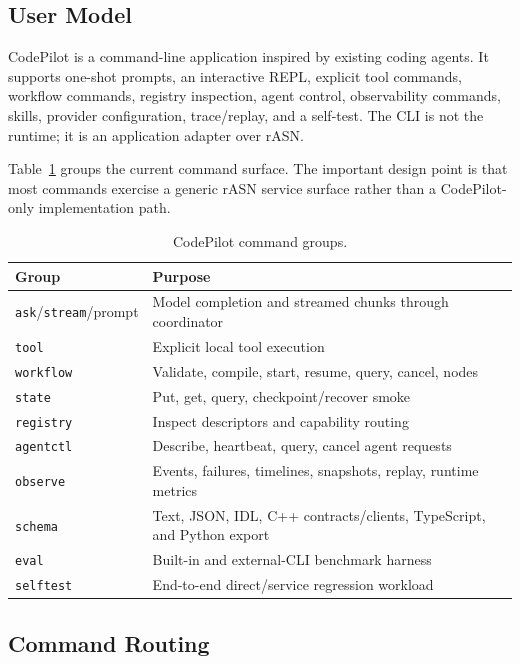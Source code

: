 \documentclass[manuscript,screen,review]{acmart}
\newcommand{\rasn}{rASN\xspace}
\newcommand{\codepilot}{CodePilot\xspace}
\begin{document}
\subsection{User Model}

\codepilot is a command-line application inspired by existing coding agents.
It supports one-shot prompts, an interactive REPL, explicit tool commands,
workflow commands, registry inspection, agent control, observability commands,
skills, provider configuration, trace/replay, and a self-test. The CLI is not
the runtime; it is an application adapter over \rasn.

Table~\ref{tab:codepilot-commands} groups the current command surface. The
important design point is that most commands exercise a generic \rasn service
surface rather than a CodePilot-only implementation path.

\begin{table}[t]
\caption{\codepilot command groups.}
\label{tab:codepilot-commands}
\centering
\begin{tabular}{ll}
\toprule
Group & Purpose \\
\midrule
\texttt{ask}/\texttt{stream}/prompt & Model completion and streamed chunks through coordinator \\
\texttt{tool} & Explicit local tool execution \\
\texttt{workflow} & Validate, compile, start, resume, query, cancel, nodes \\
\texttt{state} & Put, get, query, checkpoint/recover smoke \\
\texttt{registry} & Inspect descriptors and capability routing \\
\texttt{agentctl} & Describe, heartbeat, query, cancel agent requests \\
\texttt{observe} & Events, failures, timelines, snapshots, replay, runtime metrics \\
\texttt{schema} & Text, JSON, IDL, C++ contracts/clients, TypeScript, and Python export \\
\texttt{eval} & Built-in and external-CLI benchmark harness \\
\texttt{selftest} & End-to-end direct/service regression workload \\
\bottomrule
\end{tabular}
\end{table}

\subsection{Command Routing}
\end{document}
